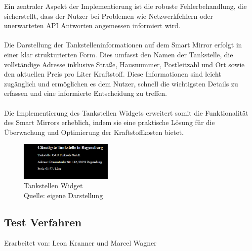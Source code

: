 \noindent
Ein zentraler Aspekt der Implementierung ist die robuste Fehlerbehandlung, die sicherstellt, dass der Nutzer bei Problemen wie Netzwerkfehlern oder unerwarteten API Antworten angemessen informiert wird.  \\ \\
\noindent
Die Darstellung der Tankstelleninformationen auf dem Smart Mirror erfolgt in einer klar strukturierten Form. Dies umfasst den Namen der Tankstelle, die vollständige Adresse inklusive Straße, Hausnummer, Postleitzahl und Ort sowie den aktuellen Preis pro Liter Kraftstoff. Diese Informationen sind leicht zugänglich und ermöglichen es dem Nutzer, schnell die wichtigsten Details zu erfassen und eine informierte Entscheidung zu treffen. \\ \\
\noindent
Die Implementierung des Tankstellen Widgets erweitert somit die Funktionalität des Smart Mirrors erheblich, indem sie eine praktische Lösung für die Überwachung und Optimierung der Kraftstoffkosten bietet.

\begin{figure}[h]
    \centering
    \includegraphics[width=0.4\textwidth]{pictures/gasstation_widget.png}
  \captionsetup{justification=centering, labelformat=simple, singlelinecheck=false}
    \caption{Tankstellen Widget\\ Quelle: eigene Darstellung}
\end{figure}

\subsection{Test Verfahren}
Erarbeitet von: Leon Kranner und Marcel Wagner \\ \\
\noindent


